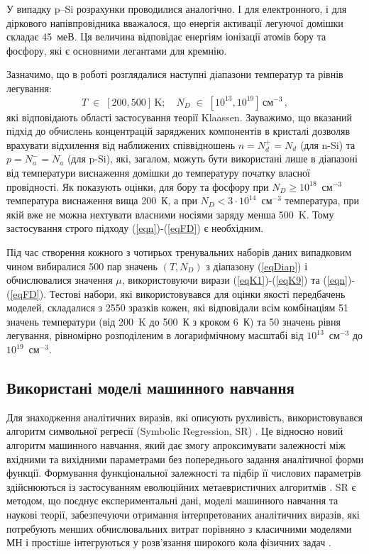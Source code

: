 \documentclass[fleqn,twoside,twocolumn,nofootinbib,showkeys]{revtex4} %
\begin{document}
У випадку p--Si розрахунки проводилися аналогічно.
І для електронного, і для діркового напівпровідника вважалося, що енергія активації легуючої домішки складає 45~меВ.
Ця величина відповідає енергіям іонізації атомів бору та фосфору, які є основними легантами для кремнію.

Зазначимо, що в роботі розглядалися наступні діапазони температур та рівнів легування:
\begin{equation}\label{eqDiap}
  T\;\in\;[200,500]\,\text{K};\quad N_D\;\in\;[10^{13},10^{19}]\,\text{см}^{-3}\,,
\end{equation}
які відповідають області застосування теорії Klaassen.
Зауважимо, що вказаний підхід до обчислень концентрацій заряджених компонентів в кристалі дозволяв врахувати
відхилення від наближених співвідношень  $n=N_d^+=N_d$ (для n-Si) та $p=N_a^-=N_a$ (для p-Si),
які, загалом, можуть бути використані лише в діапазоні від температури виснаження домішки до температуру початку власної провідності.
Як показують оцінки, для бору та фосфору при $N_D\geq10^{18}$~см$^{-3}$ температура виснаження вища 200~К,
а при  $N_D<3\cdot10^{14}$~см$^{-3}$ температура, при якій вже не можна нехтувати власними носіями заряду менша 500~K.
Тому застосування строго підходу (\ref{eqn})-(\ref{eqFD}) є необхідним.


Під час створення кожного з чотирьох тренувальних наборів даних випадковим чином вибиралися 500 пар значень $(T,N_D)$ з діапазону (\ref{eqDiap}) і
обчислювалися значення $\mu$, використовуючи вирази (\ref{eqK1})-(\ref{eqK9}) та (\ref{eqn})-(\ref{eqFD}).
Тестові набори, які використовувався для оцінки якості передбачень моделей, складалися з 2550 зразків кожен, які
відповідали всім комбінаціям 51 значень температури (від 200~K до 500~К з кроком 6~К) та 50 значень рівня легування, рівномірно розподіленим
в логарифмічному масштабі від $10^{13}$~см$^{-3}$ до $10^{19}$~см$^{-3}$.

\subsection{Використані моделі машинного навчання}

Для знаходження аналітичних виразів, які описують рухливість, використовувався алгоритм символьної регресії (Symbolic Regression, SR) \cite{Tonda2024}.
Це відносно новий алгоритм машинного навчання, який дає змогу апроксимувати залежності між вхідними та вихідними параметрами
без попереднього задання аналітичної форми функції.
Формування функціональної залежності та підбір її числових параметрів здійснюються із застосуванням еволюційних метаевристичних алгоритмів \cite{Angelis2023}.
SR є методом, що поєднує експериментальні дані, моделі машинного навчання та наукові теорії,
забезпечуючи отримання інтерпретованих аналітичних виразів, які потребують менших обчислювальних витрат порівняно
з класичними моделями МН і простіше інтегруються у розв’язання широкого кола фізичних задач \cite{Angelis2023,Hruska2025,Davis2023,Kuryliuk2026,Mengel2023,Li2023}.
\end{document}
